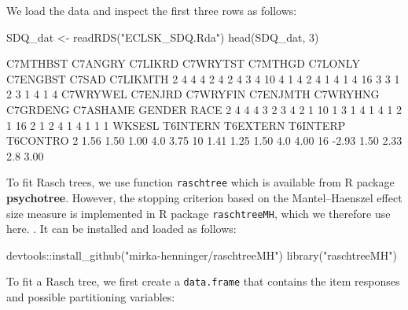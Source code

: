 \documentclass[doc,floatsintext,natbib]{apa7}
\begin{document}
We load the data and inspect the first three rows as follows:

\begin{Schunk}
\begin{Sinput}
 SDQ_dat <- readRDS("ECLSK_SDQ.Rda")
 head(SDQ_dat, 3)
\end{Sinput}
\begin{Soutput}
   C7MTHBST C7ANGRY C7LIKRD C7WRYTST C7MTHGD C7LONLY C7ENGBST C7SAD C7LIKMTH
2         4       4       4        2       4       2        4     3        4
10        4       1       4        2       4       1        4     1        4
16        3       3       1        2       3       1        4     1        4
   C7WRYWEL C7ENJRD C7WRYFIN C7ENJMTH C7WRYHNG C7GRDENG C7ASHAME GENDER RACE
2         4       4        4        3        2        3        4      2    1
10        1       3        1        4        1        4        1      2    1
16        2       1        2        4        1        4        1      1    1
   WKSESL T6INTERN T6EXTERN T6INTERP T6CONTRO
2    1.56     1.50     1.00      4.0     3.75
10   1.41     1.25     1.50      4.0     4.00
16  -2.93     1.50     2.33      2.8     3.00
\end{Soutput}
\end{Schunk}

To fit Rasch trees, we use function \verb|raschtree| which is available from R package \textbf{psychotree}. However, the stopping criterion based on the Mantel–Haenszel effect size measure is implemented in R package \verb|raschtreeMH|, which we therefore use here. . It can be installed and loaded as follows:

\begin{Schunk}
\begin{Sinput}
 devtools::install_github("mirka-henninger/raschtreeMH")
 library("raschtreeMH")
\end{Sinput}
\end{Schunk}


To fit a Rasch tree, we first create a \verb|data.frame| that contains the item responses and possible partitioning variables:

\begin{Schunk}
\end{Schunk}
\end{document}
